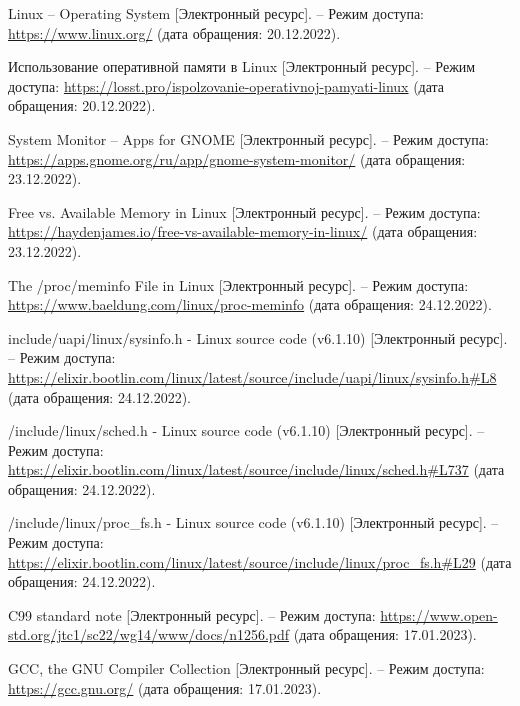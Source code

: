 
\begingroup
\renewcommand{\section}[2]{}
\begin{thebibliography}{}

Linux -- Operating System [Электронный ресурс]. -- Режим доступа: \url {https://www.linux.org/} (дата обращения: 20.12.2022).

Использование оперативной памяти в Linux [Электронный ресурс]. -- Режим доступа: \url {https://losst.pro/ispolzovanie-operativnoj-pamyati-linux} (дата обращения: 20.12.2022).

System Monitor – Apps for GNOME [Электронный ресурс]. -- Режим доступа: \url {https://apps.gnome.org/ru/app/gnome-system-monitor/} (дата обращения: 23.12.2022).

Free vs. Available Memory in Linux [Электронный ресурс]. -- Режим доступа: \url {https://haydenjames.io/free-vs-available-memory-in-linux/} (дата обращения: 23.12.2022).

The /proc/meminfo File in Linux [Электронный ресурс]. -- Режим доступа: \url {https://www.baeldung.com/linux/proc-meminfo} (дата обращения: 24.12.2022).


include/uapi/linux/sysinfo.h - Linux source code (v6.1.10) [Электронный ресурс]. -- Режим доступа: \url {https://elixir.bootlin.com/linux/latest/source/include/uapi/linux/sysinfo.h#L8} (дата обращения: 24.12.2022).


/include/linux/sched.h - Linux source code (v6.1.10) [Электронный ресурс]. -- Режим доступа: \url {https://elixir.bootlin.com/linux/latest/source/include/linux/sched.h#L737} (дата обращения: 24.12.2022).


/include/linux/proc\_fs.h - Linux source code (v6.1.10) [Электронный ресурс]. -- Режим доступа: \url {https://elixir.bootlin.com/linux/latest/source/include/linux/proc_fs.h#L29} (дата обращения: 24.12.2022).


C99 standard note [Электронный ресурс]. -- Режим доступа: \url {https://www.open-std.org/jtc1/sc22/wg14/www/docs/n1256.pdf} (дата обращения: 17.01.2023).


GCC, the GNU Compiler Collection [Электронный ресурс]. -- Режим доступа: \url {https://gcc.gnu.org/} (дата обращения: 17.01.2023).

\end{thebibliography}
\endgroup